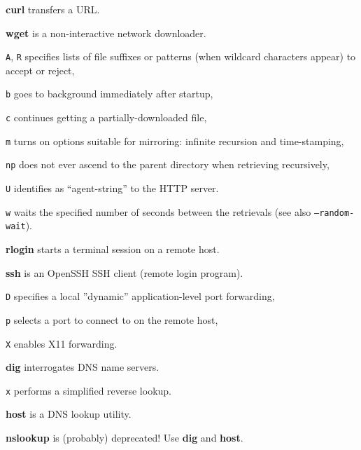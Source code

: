 \begin{enumx}
\item [\cmd] \textbf{curl} transfers a URL.
\item [\cmd] \textbf{wget} is a non-interactive network downloader.
\item [\texttt{A}, \texttt{R}] specifies lists 	of file suffixes or 
	patterns (when wildcard characters appear) to accept or reject,
\item [\texttt{b}] goes to background immediately after startup,
\item [\texttt{c}] continues getting a partially-downloaded file,
\item [\texttt{m}] turns on options suitable for mirroring: 
	infinite recursion and time-stamping,
\item [\texttt{np}] does not ever ascend to the
	parent directory when retrieving recursively,
\item [\texttt{U}] identifies as ``agent-string'' to the HTTP server.
\item [\texttt{w}] waits the specified number of seconds 
	between the retrievals (see also \texttt{--random-wait}).
\end{enumx}

\begin{enumx}
\item [\cmd] \textbf{rlogin} starts a terminal session on a remote host.
\item [\cmd] \textbf{ssh} is an OpenSSH SSH client (remote login program).
\item [\texttt{D}] specifies a local ''dynamic'' application-level port forwarding,
\item [\texttt{p}] selects a port to connect to on the remote host,
\item [\texttt{X}] enables X11 forwarding.
\end{enumx}

\begin{enumx}
\item [\cmd] \textbf{dig} interrogates DNS name servers.                        
\item [\texttt{x}] performs a simplified reverse lookup. 
\item [\cmd] \textbf{host} is a DNS lookup utility.  
\item [\cmd] \textbf{nslookup} is (probably) deprecated! Use \textbf{dig} and \textbf{host}.
\end{enumx}


